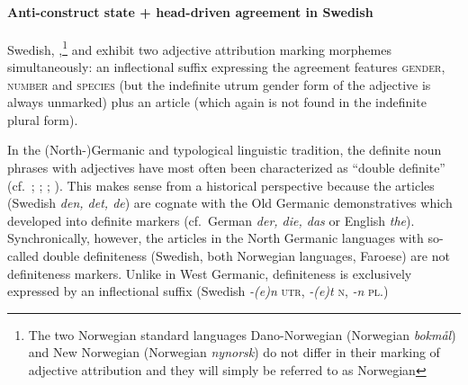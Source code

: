\paragraph*{Anti\hyp{}construct state + head\hyp{}driven agreement in Swedish}
\label{swedish synchr}
Swedish, ,\footnote{The two Norwegian standard languages Dano-Norwegian (Norwegian \textit{bokmål}) and New Norwegian (Norwegian \textit{nynorsk}) do not differ in their marking of adjective attribution and they will simply be referred to as Norwegian} and  exhibit two adjective attribution marking morphemes simultaneously: an inflectional suffix expressing the agreement features \textsc{gender}, \textsc{number} and \textsc{species} (but the indefinite utrum gender form of the adjective is always unmarked) plus an article (which again is not found in the indefinite plural form).

In the (North-)Germanic and typological linguistic tradition, the definite noun phrases with adjectives have most often been characterized as “double definite” (cf.~\citealt{kotcheva1996a}; \citealt{borjars1994}; \citealt{julien2003}; \citealt[354–355]{plank2003}). This makes sense from a historical perspective because the articles (Swedish \textit{den, det, de}) are cognate with the Old Germanic demonstratives which developed into definite markers (cf.~German \textit{der, die, das} or English \textit{the}). Synchronically, however, the articles in the North Germanic languages with so-called double definiteness (Swedish, both Norwegian languages, Faroese) are not definiteness markers. Unlike in West Germanic, definiteness is exclusively expressed by an inflectional suffix (Swedish \textit{-(e)n} \textsc{utr}, \textit{-(e)t} \textsc{n}, \textit{-n} \textsc{pl}.)

